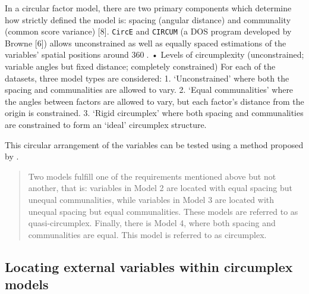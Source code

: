 \documentclass[
  authoryear,
  preprint,
  3p]{elsarticle}
\begin{document}
In a circular factor model, there are two primary components which
determine how strictly defined the model is: spacing (angular distance)
and communality (common score variance) {[}8{]}. \texttt{CircE} and
\texttt{CIRCUM} (a DOS program developed by Browne {[}6{]}) allows
unconstrained as well as equally spaced estimations of the variables'
spatial positions around 360. • Levels of circumplexity (unconstrained;
variable angles but fixed distance; completely constrained) For each of
the datasets, three model types are considered: 1. `Unconstrained' where
both the spacing and communalities are allowed to vary. 2. `Equal
communalities' where the angles between factors are allowed to vary, but
each factor's distance from the origin is constrained. 3. `Rigid
circumplex' where both spacing and communalities are constrained to form
an `ideal' circumplex structure.

This circular arrangement of the variables can be tested using a method
proposed by \citet{Rounds2000Tinsley}.

\begin{quote}
Two models fulfill one of the requirements mentioned above but not
another, that is: variables in Model 2 are located with equal spacing
but unequal communalities, while variables in Model 3 are located with
unequal spacing but equal communalities. These models are referred to as
quasi-circumplex. Finally, there is Model 4, where both spacing and
communalities are equal. This model is referred to as circumplex.
\end{quote}

\subsection{Locating external variables within circumplex
models}\label{locating-external-variables-within-circumplex-models}
\end{document}
